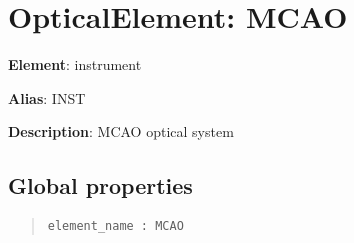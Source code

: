 

\section{OpticalElement: \textquotedbl{}MCAO\textquotedbl{}%
  \label{opticalelement-mcao}%
}

\textbf{Element}: instrument

\textbf{Alias}: INST

\textbf{Description}: MCAO optical system


\subsection{Global properties%
  \label{global-properties}%
}

\begin{quote}
\begin{alltt}
\begin{lstlisting}[frame=single]
element_name : MCAO
\end{lstlisting}
\end{alltt}
\end{quote}
